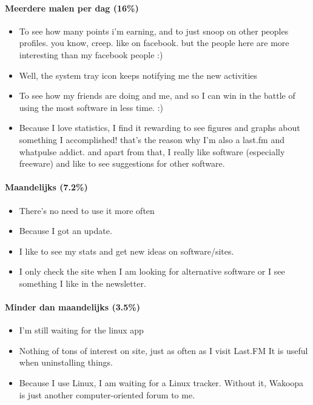 \documentclass[a4paper, 10pt, pdftex]{report}
\begin{document}
      \paragraph{Meerdere malen per dag (16\%)}
        \begin{itemize}
          \item To see how many points i'm earning, and to just snoop on other peoples profiles. you know, creep. like on facebook. but the people here are more interesting than my facebook people :)
          \item Well, the system tray icon keeps notifying me the new activities
          \item To see how my friends are doing and me, and so I can win in the battle of using the most software in less time. :)
          \item Because I love statistics, I find it rewarding to see figures and graphs about something I accomplished! that's the reason why I'm also a last.fm and whatpulse addict. and apart from that, I really like software (especially freeware) and like to see suggestions for other software.
        \end{itemize}

      \paragraph{Maandelijks (7.2\%)}
        \begin{itemize}
          \item There's no need to use it more often
          \item Because I got an update.
          \item I like to see my stats and get new ideas on software/sites.
          \item I only check the site when I am looking for alternative software or I see something I like in the newsletter.
        \end{itemize}

      \paragraph{Minder dan maandelijks (3.5\%)}
        \begin{itemize}
          \item I'm still waiting for the linux app
          \item Nothing of tons of interest on site, just as often as I visit Last.FM It is useful when uninstalling things.
          \item Because I use Linux, I am waiting for a Linux tracker. Without it, Wakoopa is just another computer-oriented forum to me.
        \end{itemize}
\end{document}
